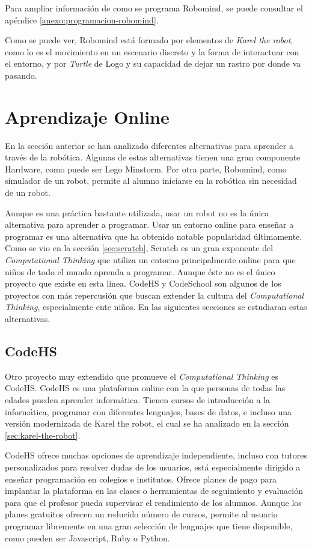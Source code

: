 {\color{blue}
Para ampliar información de como se programa Robomind, se puede consultar el apéndice \ref{anexo:programacion-robomind}.

Como se puede ver, Robomind está formado por elementos de \emph{Karel the robot}, como lo es el movimiento en un escenario discreto y la forma de interactuar con el entorno, y por \emph{Turtle} de Logo y su capacidad de dejar un rastro por donde va pasando.
}


\section{Aprendizaje Online}
\label{sec:aprendiendo-online}

En la sección anterior se han analizado diferentes alternativas para aprender a través de la robótica. Algunas de estas alternativas tienen una gran componente Hardware, como puede ser Lego Minstorm. Por otra parte, Robomind, como simulador de un robot, permite al alumno iniciarse en la robótica sin necesidad  de un robot. 

Aunque es una práctica bastante utilizada, usar un robot no es la única alternativa para aprender a programar. Usar un entorno online para enseñar a programar es una alternativa que ha obtenido notable popularidad últimamente. Como se vio en la sección \ref{sec:scratch}, Scratch es un gran exponente del \emph{Computational Thinking} que utiliza un entorno principalmente online para que niños de todo el mundo aprenda a programar. Aunque éste no es el único proyecto que existe en esta linea. CodeHS y CodeSchool son algunos de los proyectos con más repercusión que buscan extender la cultura del \emph{Computational Thinking}, especialmente ente niños. En las siguientes secciones se estudiaran estas alternativas.

\subsection{CodeHS}
\label{sec:CodeHS}


Otro proyecto muy extendido que promueve el \emph{Computational Thinking} es CodeHS. CodeHS es una plataforma online con la que personas de todas las edades pueden aprender informática. Tienen cursos de introducción a la informática, programar con diferentes lenguajes, bases de datos, e incluso una versión modernizada de Karel the robot, el cual se ha analizado en la sección \ref{sec:karel-the-robot}.

CodeHS ofrece muchas opciones de aprendizaje independiente, incluso con tutores personalizados para resolver dudas de los usuarios, está especialmente dirigido a enseñar programación en colegios e institutos. Ofrece planes de pago para implantar la plataforma en las clases o herramientas de seguimiento y evaluación para que el profesor pueda supervisar el rendimiento de los alumnos. Aunque los planes gratuitos ofrecen un reducido número de cursos, permite al usuario programar libremente en una gran selección de lenguajes que tiene disponible, como pueden ser Javascript, Ruby o Python.


